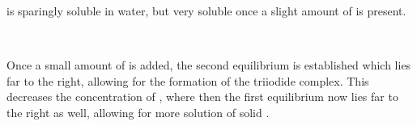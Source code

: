 \documentclass[../main]{subfiles}
\begin{document}
	 is sparingly soluble in water, but very soluble once a slight amount of  is present.

	\begin{center}
		 \\
	\end{center}

	Once a small amount of  is added, the second equilibrium is established which lies far to the right, allowing for the formation of the triiodide  complex. This decreases the concentration of , where then the first equilibrium now lies far to the right as well, allowing for more solution of solid .
\end{document}
